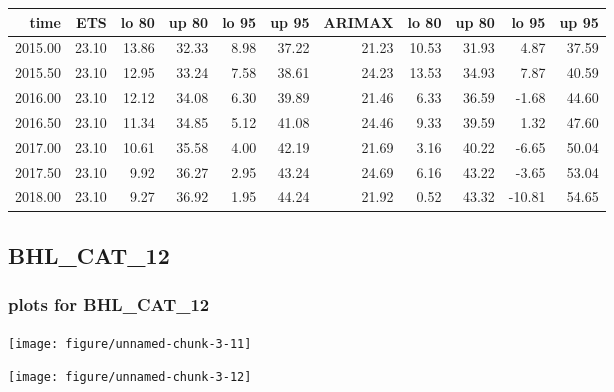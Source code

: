 \documentclass[10pt,a4paper]{article}\usepackage[]{graphicx}\usepackage[]{color}
\makeatletter
\def\maxwidth{ %
  \ifdim\Gin@nat@width>\linewidth
    \linewidth
  \else
    \Gin@nat@width
  \fi
}
\newcommand{\AaA}{\_}
\makeatother
\begin{document}
\begin{table}[ht]
\centering
\begin{tabular}{rrrrrrrrrrr}
  \hline
time & ETS  & lo 80 & up 80 & lo 95 & up 95 & ARIMAX  & lo 80 & up 80 & lo 95 & up 95 \\ 
  \hline
2015.00 & 23.10 & 13.86 & 32.33 & 8.98 & 37.22 & 21.23 & 10.53 & 31.93 & 4.87 & 37.59 \\ 
  2015.50 & 23.10 & 12.95 & 33.24 & 7.58 & 38.61 & 24.23 & 13.53 & 34.93 & 7.87 & 40.59 \\ 
  2016.00 & 23.10 & 12.12 & 34.08 & 6.30 & 39.89 & 21.46 & 6.33 & 36.59 & -1.68 & 44.60 \\ 
  2016.50 & 23.10 & 11.34 & 34.85 & 5.12 & 41.08 & 24.46 & 9.33 & 39.59 & 1.32 & 47.60 \\ 
  2017.00 & 23.10 & 10.61 & 35.58 & 4.00 & 42.19 & 21.69 & 3.16 & 40.22 & -6.65 & 50.04 \\ 
  2017.50 & 23.10 & 9.92 & 36.27 & 2.95 & 43.24 & 24.69 & 6.16 & 43.22 & -3.65 & 53.04 \\ 
  2018.00 & 23.10 & 9.27 & 36.92 & 1.95 & 44.24 & 21.92 & 0.52 & 43.32 & -10.81 & 54.65 \\ 
   \hline
\end{tabular}
\end{table}

\newpage
\subsection{BHL\AaA CAT\AaA 12}
\subsubsection{plots for BHL\AaA CAT\AaA 12}

\texttt{[image: figure/unnamed-chunk-3-11]} 

\newpage

\texttt{[image: figure/unnamed-chunk-3-12]} 

\newpage
\end{document}

